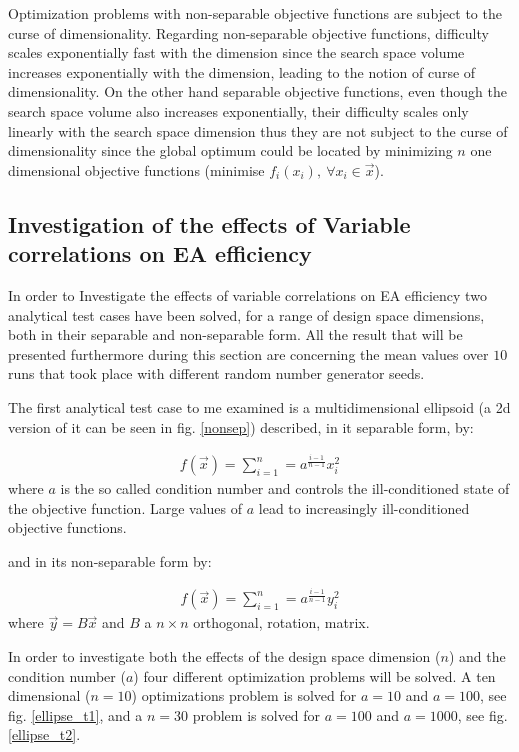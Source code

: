 Optimization problems with non-separable objective functions are subject to the curse of dimensionality. Regarding non-separable objective functions, difficulty scales exponentially fast with the dimension since the search space volume increases exponentially with the dimension, leading to the notion of curse of dimensionality. On the other hand separable objective functions, even though the search space volume also increases exponentially, their difficulty scales only linearly with the search space dimension thus they are not subject to the curse of dimensionality since the global optimum could be located by minimizing $n$ one dimensional objective functions (minimise $f_i(x_i),~ \forall x_i \in \vec{x}$).
 
\subsection{Investigation of the effects of Variable correlations on EA efficiency}
\label{Inv2}

In order to Investigate the effects of variable correlations on EA efficiency two analytical test cases have been solved, for a range of design space dimensions, both in their separable and non-separable form. All the result that will be presented furthermore during this section are concerning the mean values over $10$ runs that took place with different random number generator seeds. 

The first analytical test case to me examined is a multidimensional ellipsoid (a 2d version of it can be seen in fig. \ref{nonsep}) described, in it separable form, by:   


\begin{eqnarray}
   f(\vec{x})=\sum^{n}_{i=1}=a^{\frac{i-1}{n-1}}x_i^2
   \label{ellipse} 
\end{eqnarray}
where $a$ is the so called condition number and controls the ill-conditioned state of the objective function. Large values of $a$ lead to increasingly ill-conditioned objective functions.

and in its non-separable form by:

\begin{eqnarray}
   f(\vec{x})=\sum^{n}_{i=1}=a^{\frac{i-1}{n-1}}y_i^2
   \label{ellipse} 
\end{eqnarray}
where $\vec{y}=B\vec{x}$ and $B$ a $n\times n$ orthogonal, rotation, matrix.

In order to investigate both the effects of the design space dimension ($n$) and the condition number ($a$) four different optimization problems will be solved. A ten dimensional ($n=10$) optimizations problem is solved for $a=10$ and $a=100$, see fig. \ref{ellipse_t1}, and a $n=30$ problem is solved for $a=100$ and $a=1000$, see fig. \ref{ellipse_t2}. 


